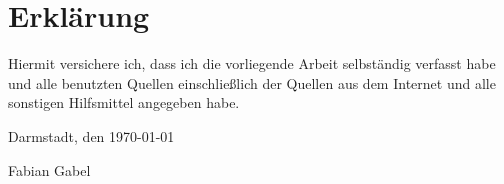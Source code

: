 \thispagestyle{empty}

\vspace*{4cm}
\section*{Erklärung}

Hiermit versichere ich, dass ich die vorliegende Arbeit selbständig verfasst habe und alle benutzten Quellen einschließlich der Quellen aus dem Internet und alle sonstigen Hilfsmittel angegeben habe.\vspace{20pt}

\noindent
Darmstadt, den \today\vspace{60pt}


\noindent
Fabian Gabel

